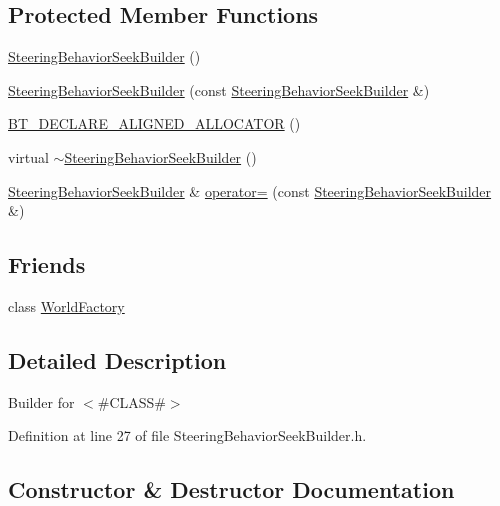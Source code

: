\subsection*{Protected Member Functions}
\begin{DoxyCompactItemize}
\item 
\mbox{\hyperlink{classnjli_1_1_steering_behavior_seek_builder_a8326b60a5c1fd204cd2beeac30576d92}{Steering\+Behavior\+Seek\+Builder}} ()
\item 
\mbox{\hyperlink{classnjli_1_1_steering_behavior_seek_builder_ad9b3c75175af3ca6b6cc36be732ccbb7}{Steering\+Behavior\+Seek\+Builder}} (const \mbox{\hyperlink{classnjli_1_1_steering_behavior_seek_builder}{Steering\+Behavior\+Seek\+Builder}} \&)
\item 
\mbox{\hyperlink{classnjli_1_1_steering_behavior_seek_builder_a772f5212e2beb259e42bb27c15e7cfad}{B\+T\+\_\+\+D\+E\+C\+L\+A\+R\+E\+\_\+\+A\+L\+I\+G\+N\+E\+D\+\_\+\+A\+L\+L\+O\+C\+A\+T\+OR}} ()
\item 
virtual \mbox{\hyperlink{classnjli_1_1_steering_behavior_seek_builder_a2e1c772dbd24926f2ddbb12fa78ff269}{$\sim$\+Steering\+Behavior\+Seek\+Builder}} ()
\item 
\mbox{\hyperlink{classnjli_1_1_steering_behavior_seek_builder}{Steering\+Behavior\+Seek\+Builder}} \& \mbox{\hyperlink{classnjli_1_1_steering_behavior_seek_builder_a7b8b7c1de730a2bfb15a6cca0069ebab}{operator=}} (const \mbox{\hyperlink{classnjli_1_1_steering_behavior_seek_builder}{Steering\+Behavior\+Seek\+Builder}} \&)
\end{DoxyCompactItemize}
\subsection*{Friends}
\begin{DoxyCompactItemize}
\item 
class \mbox{\hyperlink{classnjli_1_1_steering_behavior_seek_builder_acb96ebb09abe8f2a37a915a842babfac}{World\+Factory}}
\end{DoxyCompactItemize}


\subsection{Detailed Description}
Builder for $<$\#\+C\+L\+A\+SS\#$>$ 

Definition at line 27 of file Steering\+Behavior\+Seek\+Builder.\+h.



\subsection{Constructor \& Destructor Documentation}
\mbox{\label{classnjli_1_1_steering_behavior_seek_builder_a8326b60a5c1fd204cd2beeac30576d92}} 
